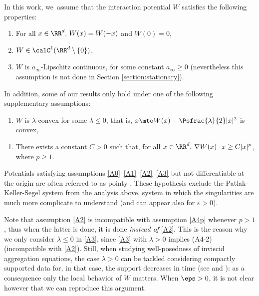 In this work, we~assume that the interaction potential $W$ satisfies the following properties:
\begin{enumerate}\renewcommand{\theenumi}{\textup{A}\arabic{enumi}}\setcounter{enumi}{-1}
\item\label{A0}
For all $x \in \RR^d, \, W(x)=W(-x)$ and $W(0)=0$,
\item\label{A1}
$W\in \calC^1(\RR^d\setminus\{0\})$,
\item\label{A2}
$W$ is $a_\infty$-Lipschitz continuous, for some constant $a_\infty \geq 0$ (nevertheless this assumption is not done in Section \ref{section:stationary}).
\end{enumerate}
In addition, some of our results only hold under one of the following supplementary assumptions:
\begin{enumerate}\renewcommand{\theenumi}{\textup{A}\arabic{enumi}}\setcounter{enumi}{2}
\item\label{A3}
$W$ is $\lambda$-convex for some $\lambda \leq 0$, that is, $x \mto W(x) - \Psfrac{\lambda}{2} |x|^2$ is convex,
\end{enumerate}
\begin{enumerate}\renewcommand{\theenumi}{\textup{A}\arabic{enumi}\textup{-}$p$}\setcounter{enumi}{3}
\item\label{A4p}
There exists a constant $C>0$ such that, for all $x \in \RR^d, \,\nabla W(x) \cdot x \geq C |x|^p$, where $p \geq 1$.
\end{enumerate}
Potentials satisfying assumptions \eqref{A0}--\eqref{A1}--\eqref{A2}--\eqref{A3}
but not differentiable at the origin are often referred to as pointy \cite{cjlv15,dlv20,lv17}.
These hypothesis exclude the Patlak-Keller-Segel system from the analysis above, system in which the singularities are much more complicate to understand (and can appear also for
$\varepsilon > 0$).
\begin{remark}
Note that assumption \eqref{A2} is incompatible with assumption \eqref{A4p} whenever $p>1$, thus when the latter is done, it is done {\em instead of} \eqref{A2}. This is the reason why we only consider $\lambda \leq 0$ in \eqref{A3}, since \eqref{A3} with $\lambda>0$ implies (A4-2) (incompatible with \eqref{A2}). Still, when studying well-posedness of inviscid aggregation equations, the case $\lambda >0$ can be tackled considering compactly supported data for, in that case, the support decreases in time (see \cite[Th.\,2.1]{dlv20} and \cite[Rem.\,2.14]{figalli11}): as a consequence only the local behavior of $W$ matters. When $\eps >0$, it is not clear however that we can reproduce this argument.
\end{remark}

